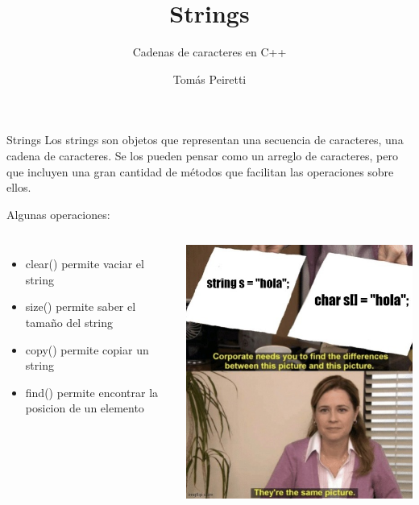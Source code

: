 \documentclass[12pt]{beamer}
\title{Strings}
\subtitle{Cadenas de caracteres en C++}
\author{Tomás Peiretti}
\date{}
\begin{document}
\maketitle

\begin{frame}{Strings}
    Los strings son objetos que representan una secuencia de caracteres, una \alert{cadena de caracteres}. Se los pueden pensar como un arreglo de caracteres, pero que incluyen una gran cantidad de métodos que facilitan las operaciones sobre ellos.
    
    \medskip

    Algunas operaciones:
    \begin{columns}
        \begin{itemize}
                \item \alert{clear()} permite vaciar el string
                \item \alert{size()} permite saber el tamaño del string
                \item \alert{copy()} permite copiar un string
                \item \alert{find()} permite encontrar la posicion de un elemento
            \end{itemize}
        \includegraphics[width=\textwidth]{meme.jpeg}
    \end{columns}
\end{frame}
\end{document}
